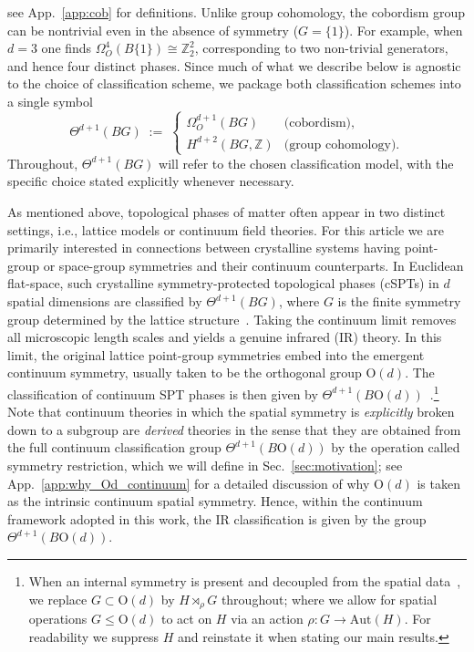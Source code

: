 \documentclass[aps,prx,reprint,superscriptaddress,twocolumn,amsmath,amssymb,amsfonts, nofootinbib]{revtex4-2}
\theoremstyle{apsstyle}
\begin{document}
see App.~\ref{app:cob} for definitions.  
Unlike group cohomology, the cobordism group can be  nontrivial even in the absence of symmetry  ($G=\{1\}$). For example, when $d=3$ one finds $\Omega^{4}_{O}(B\{1\})\cong\mathbb{Z}_{2}^{2}$, corresponding to two non-trivial generators, and hence four distinct phases. Since much of what we describe below is agnostic to the choice of classification scheme, we package both classification schemes into a single symbol
\begin{equation*}
   \Theta^{d+1}(BG)\;:=\;
   \begin{cases}
     \Omega^{d+1}_{O}(BG) & \text{(cobordism)},\\[2pt]
     H^{d+2}(BG,\mathbb Z) & \text{(group cohomology)}.
   \end{cases}
\end{equation*}
Throughout, $\Theta^{d+1}(BG)$ will refer to the chosen classification model, with the specific choice stated explicitly whenever necessary.

As mentioned above, topological phases of matter often appear in two distinct settings, i.e., lattice models or continuum field theories. For this article we are primarily interested in connections between crystalline systems having point-group or space-group symmetries and their continuum counterparts.  
In Euclidean flat-space, such crystalline symmetry-protected topological phases (cSPTs) in $d$ spatial dimensions are classified by $\Theta^{d+1}(BG)$, where $G$ is the finite symmetry group determined by the lattice structure~\cite{ThorngrenElse, Huang2017}.  
Taking the continuum limit removes all microscopic length scales and yields a genuine infrared (IR) theory.  
In this limit, the original lattice point-group symmetries embed into the emergent continuum symmetry, usually taken to be the orthogonal group $\mathrm{O}(d)$.  
The classification of continuum SPT phases is then given by $\Theta^{d+1}(B\mathrm{O}(d))$~\cite{Fradkin2014, Fradkin2015, Hung2013, Hung2013_2, Rao2023, Gromov2014, Gromov2016}.\footnote{When an internal symmetry is present and decoupled from the spatial data~\cite{note_decouple}, we replace $G\subset \mathrm{O}(d)$ by $H\rtimes_{\rho} G$ throughout; where we allow for spatial operations $G\leq \mathrm{O}(d)$ to act on $H$ via an action $\rho: G \to \mathrm{Aut}(H)$. For readability we suppress $H$ and reinstate it when stating our main results.} Note that continuum theories in which the spatial symmetry is \textit{explicitly} broken down to a subgroup are \textit{derived} theories in the sense that they are obtained from the full continuum classification group $\Theta^{d+1}(B\mathrm{O}(d))$ by the operation called symmetry restriction, which we will define in Sec.~\ref{sec:motivation}; see App.~\ref{app:why_Od_continuum} for a detailed discussion of why $\mathrm{O}(d)$ is taken as the intrinsic continuum spatial symmetry. Hence, within the continuum framework adopted in this work, the IR classification is given by the group $\Theta^{d+1}(B\mathrm{O}(d))$.
\end{document}
